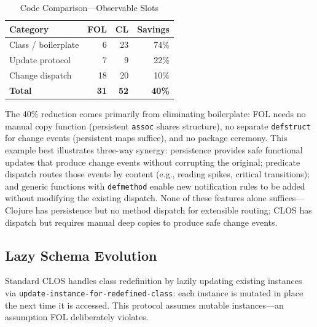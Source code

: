 \documentclass[sigconf,nonacm,review]{acmart}
\begin{document}
\begin{table}[htbp]
\caption{Code Comparison---Observable Slots}
\label{tab:observable}
\begin{tabular}{lrrr}
\toprule
\textbf{Category} & \textbf{FOL} & \textbf{CL} & \textbf{Savings} \\
\midrule
Class / boilerplate & 6 & 23 & 74\% \\
Update protocol & 7 & 9 & 22\% \\
Change dispatch & 18 & 20 & 10\% \\
\textbf{Total} & \textbf{31} & \textbf{52} & \textbf{40\%} \\
\bottomrule
\end{tabular}
\end{table}

The 40\% reduction comes primarily from eliminating boilerplate: FOL needs no manual copy function (persistent \texttt{assoc} shares structure), no separate \texttt{defstruct} for change events (persistent maps suffice),
and no package ceremony. This example best illustrates three-way synergy: persistence provides safe functional updates that produce change events without corrupting the original; predicate dispatch routes those events
by content (e.g., reading spikes, critical transitions); and generic functions with \texttt{defmethod} enable new notification rules to be added without modifying the existing dispatch. None of these features alone
suffices---Clojure has persistence but no method dispatch for extensible routing; CLOS has dispatch but requires manual deep copies to produce safe change events.

\subsection{Lazy Schema Evolution}

Standard CLOS handles class redefinition by lazily updating existing instances via \texttt{update-instance-for-redefined-class}: each instance is mutated in place the next time it is accessed. This protocol assumes
mutable instances---an assumption FOL deliberately violates.
\end{document}
